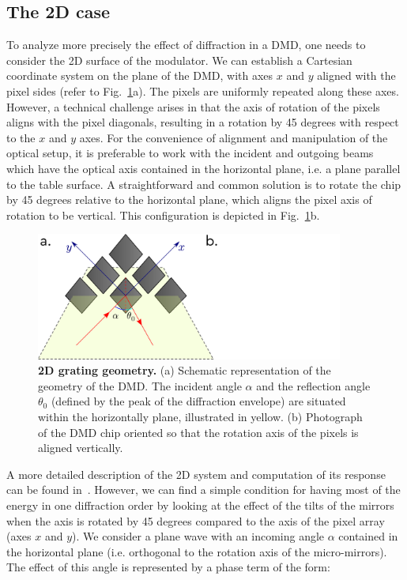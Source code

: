 \documentclass[12pt]{iopart}
\begin{document}
\subsection{The 2D case}

To analyze more precisely the effect of diffraction in a DMD,
one needs to consider the 2D surface of the modulator.
We can establish a Cartesian coordinate system on the plane of the DMD,
with axes $x$ and $y$ aligned with the pixel sides
(refer to Fig.~\ref{fig:2d_geom}a).
The pixels are uniformly repeated along these axes.
However, a technical challenge arises
in that the axis of rotation of the pixels
aligns with the pixel diagonals,
resulting in a rotation by 45 degrees with respect to the $x$ and $y$ axes.
For the convenience of alignment and manipulation of the optical setup,
it is preferable to work with the incident and outgoing beams
which have the optical axis contained in the horizontal plane,
i.e. a plane parallel to the table surface.
A straightforward and common solution is to rotate the chip by 45 degrees
relative to the horizontal plane,
which aligns the pixel axis of rotation to be vertical.
This configuration is depicted in Fig.~\ref{fig:2d_geom}b.\\



\begin{figure}
  \centering
  \includegraphics[width = 0.9\textwidth]{images/dmd_45.pdf}
  \caption{
    \textbf{2D grating geometry.}
    (a) Schematic representation of the geometry of the DMD.
    The incident  angle $\alpha$ and the reflection angle $\theta_0$ (defined by the peak of the diffraction envelope) are situated
    within the horizontally plane, illustrated in yellow.
    (b) Photograph of the DMD chip oriented so that the rotation axis of the pixels
    is aligned vertically.
  }
  \label{fig:2d_geom}
\end{figure}


A more detailed description of the 2D system 
and computation of its response 
can be found in~\cite{Scholes2019structured}.
However, we can find a simple condition for
having most of the energy in one diffraction order 
by looking at the effect of the tilts of the mirrors 
when the axis is rotated by 45 degrees compared to 
the axis of the pixel array (axes $x$ and $y$). 
We consider a plane wave with an incoming angle $\alpha$ contained in the horizontal plane 
(i.e. orthogonal to the rotation axis of the micro-mirrors).
The effect of this angle is represented by a phase term of the form:
\end{document}
